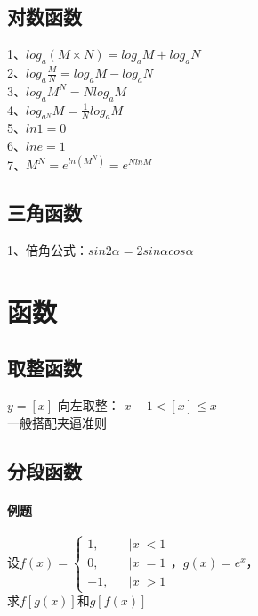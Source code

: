 \documentclass{article}
\begin{document}
\begin{flushleft}
	\subsection{对数函数}
	1、$log_a(M\times N)=log_aM+log_aN$\\
	2、$log_a\frac{M}{N}=log_aM-log_aN$\\
	3、$log_aM^N=Nlog_aM$\\
	4、$log_{a^N}M=\frac{1}{N}log_aM$\\
	5、$ln1=0$\\
	6、$lne=1$\\
	7、$M^N=e^{ln(M^N)}=e^{NlnM}$\\
	
	\subsection{三角函数}
	1、倍角公式：$sin2α=2sinαcosα$\\
	
	
	
	\section{函数}
	
	\subsection{取整函数}
	$y=[x]$ 向左取整： $x-1<[x]\leq x$\\
	一般搭配夹逼准则\\
	
	\subsection{分段函数}
	
	\paragraph{例题}
	设$f(x)=\left\{
	\begin{array}{rcl}
		1,& & |x|<1\\
		0,& & |x|=1\\
		-1,& & |x|>1
	\end{array} \right.，g(x)=e^x$，\\
	求$f[g(x)]$和$g[f(x)]$

\end{flushleft}
\end{document}
